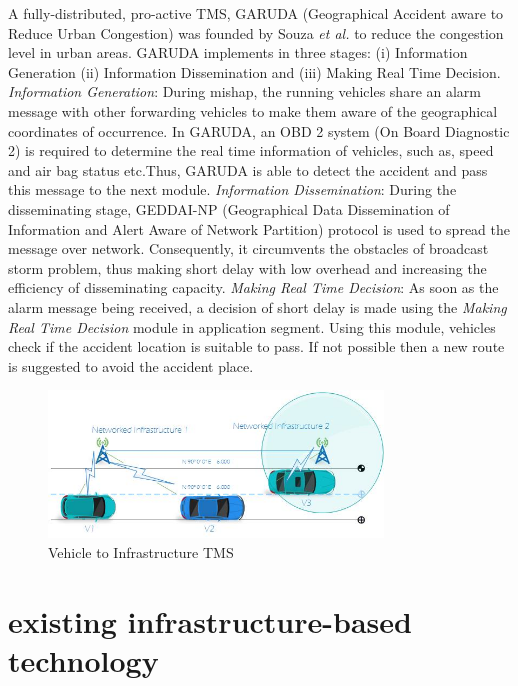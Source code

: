 \documentclass[conference]{IEEEtran}
\begin{document}
A fully-distributed, pro-active TMS, GARUDA (Geographical Accident aware to Reduce Urban Congestion) was founded by Souza \textit{et al.} \cite{de2015garuda} to reduce the congestion level in urban areas. GARUDA implements in three stages: (i) Information Generation (ii) Information Dissemination and (iii) Making Real Time Decision. \textit{Information Generation}: During mishap, the running vehicles share an alarm message with other forwarding vehicles to make them aware of the geographical coordinates of occurrence. In GARUDA, an OBD 2 system (On Board Diagnostic 2) is required to determine the real time information of vehicles, such as, speed and air bag status etc.Thus, GARUDA is able to detect the accident and pass this message to the next module. \textit{Information Dissemination}: During the disseminating stage, GEDDAI-NP (Geographical
Data Dissemination of Information and Alert Aware of Network
Partition) protocol is used to spread the message over network. Consequently, it circumvents the obstacles of broadcast storm problem, thus making short delay with low overhead and increasing the efficiency of disseminating capacity. \textit{Making Real Time Decision}: As soon as the alarm message being received, a decision of short delay is made using the \textit{Making Real Time Decision} module in application segment. Using this module, vehicles check if the accident location is suitable to pass. If not possible then a new route is suggested to avoid the accident place.








\begin{figure}[!ht]
\centering
\includegraphics[width=3.5in]{V2I}
\caption{Vehicle to Infrastructure TMS}
\label{fig_ldosAttProf}
\end{figure}

\section{existing infrastructure-based technology}
\end{document}
